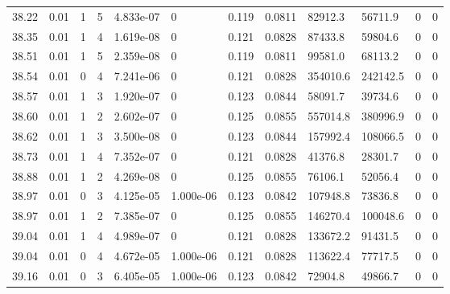 \documentclass[preview]{standalone}
\begin{document}
{{{{{{{{{{\begin{tabular}{L{1.2cm}C{1.2cm} C{0.3cm}C{0.5cm} C{1.4cm}C{1.4cm} C{1.4cm}C{1.4cm} C{1.6cm}C{1.6cm} C{1.6cm}C{1.6cm}}
  38.22  &  0.01  & 1     &  5 &  4.833e-07  & 0  &  0.119&   0.0811& 82912.3 & 56711.9   &  0 & 0  \\ 
  38.35  &  0.01  & 1     &  4 &  1.619e-08  & 0  &  0.121&   0.0828& 87433.8 & 59804.6   &  0 & 0  \\ 
  38.51  &  0.01  & 1     &  5 &  2.359e-08  & 0  &  0.119&   0.0811& 99581.0 & 68113.2   &  0 & 0  \\ 
  38.54  &  0.01  & 0     &  4 &  7.241e-06  & 0  &  0.121&   0.0828& 354010.6 & 242142.5   &  0 & 0  \\ 
  38.57  &  0.01  & 1     &  3 &  1.920e-07  & 0  &  0.123&   0.0844& 58091.7 & 39734.6   &  0 & 0  \\ 
  38.60  &  0.01  & 1     &  2 &  2.602e-07  & 0  &  0.125&   0.0855& 557014.8 & 380996.9   &  0 & 0  \\ 
  38.62  &  0.01  & 1     &  3 &  3.500e-08  & 0  &  0.123&   0.0844& 157992.4 & 108066.5   &  0 & 0  \\ 
  38.73  &  0.01  & 1     &  4 &  7.352e-07  & 0  &  0.121&   0.0828& 41376.8 & 28301.7   &  0 & 0  \\ 
  38.88  &  0.01  & 1     &  2 &  4.269e-08  & 0  &  0.125&   0.0855& 76106.1 & 52056.4   &  0 & 0  \\ 
  38.97  &  0.01  & 0     &  3 &  4.125e-05  & 1.000e-06  &  0.123&   0.0842& 107948.8 & 73836.8   &  0 & 0  \\ 
  38.97  &  0.01  & 1     &  2 &  7.385e-07  & 0  &  0.125&   0.0855& 146270.4 & 100048.6   &  0 & 0  \\ 
  39.04  &  0.01  & 1     &  4 &  4.989e-07  & 0  &  0.121&   0.0828& 133672.2 & 91431.5   &  0 & 0  \\ 
  39.04  &  0.01  & 0     &  4 &  4.672e-05  & 1.000e-06  &  0.121&   0.0828& 113622.4 & 77717.5   &  0 & 0  \\ 
  39.16  &  0.01  & 0     &  3 &  6.405e-05  & 1.000e-06  &  0.123&   0.0842& 72904.8 & 49866.7   &  0 & 0  \\ 
\hline 
\end{tabular} 

}}}}}}}}}}
\end{document}
